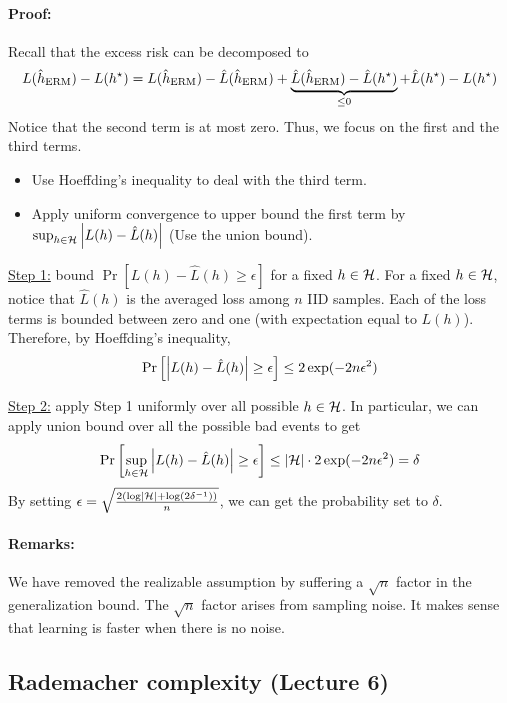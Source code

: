 \paragraph{Proof:} Recall that the excess risk can be decomposed to
\begin{align*}
    L(\hat h_{\textup{ERM}}) - L(h^{\star})
    = L(\hat h_{\textup{ERM}}) - \hat L(\hat h_{\textup{ERM}}) + \underbrace{\hat L(\hat h_{\textup{ERM}}) - \hat L(h^{\star})}_{\le 0} + \hat L(h^{\star}) - L(h^{\star})
\end{align*}
Notice that the second term is at most zero.
Thus, we focus on the first and the third terms.
\begin{itemize}
    \item Use Hoeffding’s inequality to deal with the third term.
    
    \item Apply uniform convergence to upper bound the first term by $\sup_{h\in\mathcal{H}} \left\lvert L(h) - \hat L(h)\right\rvert$ (Use the union bound).
\end{itemize}

\underline{Step 1:} bound $\Pr[L(h) - \hat L(h) \ge \epsilon]$ for a fixed $h \in \mathcal{H}$.
For a fixed $h \in \mathcal{H}$, notice that $\hat L(h)$ is the averaged loss among $n$ IID samples.
Each of the loss terms is bounded between zero and one (with expectation equal to $L(h)$).
Therefore, by Hoeffding's inequality,
\[ \Pr\left[ \left\lvert L(h) - \hat L(h)\right\rvert \ge \epsilon\right] \le 2\exp(-2n\epsilon^2) \]

\underline{Step 2:} apply Step 1 uniformly over all possible $h \in \mathcal{H}$.
In particular, we can apply union bound over all the possible bad events to get
\[ \Pr\left[ \sup_{h\in\mathcal{H}} \left\lvert L(h) - \hat L(h)\right\rvert \ge \epsilon \right] \le \left\lvert\mathcal{H}\right\rvert \cdot 2\exp(-2n\epsilon^2) = \delta \]
By setting $\epsilon = \sqrt{\frac {2(\log\left\lvert\mathcal{H}\right\rvert + \log(2\delta^{-1}))} n }$, we can get the probability set to $\delta$.

\paragraph{Remarks:} We have removed the realizable assumption by suffering a $\sqrt n$ factor in the generalization bound. The $\sqrt n$ factor arises from sampling noise.
It makes sense that learning is faster when there is no noise.
\fi

\subsection{Rademacher complexity (Lecture 6)}

